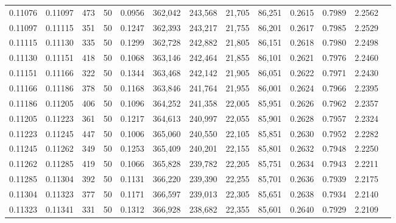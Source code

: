 \begin{tabular}{rrrrrrrrrrrrr}
0.11076 & 0.11097 &   473 &  50 &                                     0.0956 & 362,042 & 243,568 &  21,705 &  86,251 & 0.2615 & 0.7989 & 2.2562 \\
0.11097 & 0.11115 &   351 &  50 &                                     0.1247 & 362,393 & 243,217 &  21,755 &  86,201 & 0.2617 & 0.7985 & 2.2529 \\
0.11115 & 0.11130 &   335 &  50 &                                     0.1299 & 362,728 & 242,882 &  21,805 &  86,151 & 0.2618 & 0.7980 & 2.2498 \\
0.11130 & 0.11151 &   418 &  50 &                                     0.1068 & 363,146 & 242,464 &  21,855 &  86,101 & 0.2621 & 0.7976 & 2.2460 \\
0.11151 & 0.11166 &   322 &  50 &                                     0.1344 & 363,468 & 242,142 &  21,905 &  86,051 & 0.2622 & 0.7971 & 2.2430 \\
0.11166 & 0.11186 &   378 &  50 &                                     0.1168 & 363,846 & 241,764 &  21,955 &  86,001 & 0.2624 & 0.7966 & 2.2395 \\
0.11186 & 0.11205 &   406 &  50 &                                     0.1096 & 364,252 & 241,358 &  22,005 &  85,951 & 0.2626 & 0.7962 & 2.2357 \\
0.11205 & 0.11223 &   361 &  50 &                                     0.1217 & 364,613 & 240,997 &  22,055 &  85,901 & 0.2628 & 0.7957 & 2.2324 \\
0.11223 & 0.11245 &   447 &  50 &                                     0.1006 & 365,060 & 240,550 &  22,105 &  85,851 & 0.2630 & 0.7952 & 2.2282 \\
0.11245 & 0.11262 &   349 &  50 &                                     0.1253 & 365,409 & 240,201 &  22,155 &  85,801 & 0.2632 & 0.7948 & 2.2250 \\
0.11262 & 0.11285 &   419 &  50 &                                     0.1066 & 365,828 & 239,782 &  22,205 &  85,751 & 0.2634 & 0.7943 & 2.2211 \\
0.11285 & 0.11304 &   392 &  50 &                                     0.1131 & 366,220 & 239,390 &  22,255 &  85,701 & 0.2636 & 0.7939 & 2.2175 \\
0.11304 & 0.11323 &   377 &  50 &                                     0.1171 & 366,597 & 239,013 &  22,305 &  85,651 & 0.2638 & 0.7934 & 2.2140 \\
0.11323 & 0.11341 &   331 &  50 &                                     0.1312 & 366,928 & 238,682 &  22,355 &  85,601 & 0.2640 & 0.7929 & 2.2109 \\

\end{tabular}
